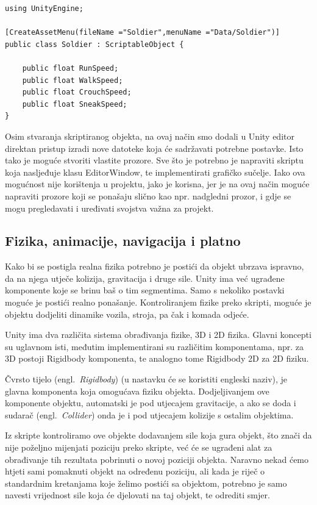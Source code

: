 \begin{lstlisting}[caption={Stvaranje skriptiranog objekta}, label=CreateScriptableObject]
using UnityEngine;

[CreateAssetMenu(fileName ="Soldier",menuName ="Data/Soldier")]
public class Soldier : ScriptableObject {

    public float RunSpeed;
    public float WalkSpeed;
    public float CrouchSpeed;
    public float SneakSpeed;
}
\end{lstlisting}

Osim stvaranja skriptiranog objekta, na ovaj način smo dodali u Unity editor direktan pristup izradi nove datoteke koja će sadržavati potrebne postavke.
Isto tako je moguće stvoriti vlastite prozore. Sve što je potrebno je napraviti skriptu koja nasljeđuje klasu EditorWindow, te implementirati grafičko sučelje. Iako ova mogućnost nije korištenja u projektu, jako je korisna, jer je na ovaj način moguće napraviti prozore koji se ponašaju slično kao npr. nadgledni prozor, i gdje se mogu pregledavati i uređivati svojstva važna za projekt.

\subsection{Fizika, animacije, navigacija i platno}
Kako bi se postigla realna fizika potrebno je postići da objekt ubrzava ispravno, da na njega utječe kolizija, gravitacija i druge sile. Unity ima već ugrađene komponente koje se brinu baš o tim segmentima. Samo s nekoliko postavki moguće je postići realno ponašanje. Kontroliranjem fizike preko skripti, moguće je objektu dodjeliti dinamike vozila, stroja, pa čak i komada odjeće.

Unity ima dva različita sistema obrađivanja fizike, 3D i 2D fizika. Glavni koncepti su uglavnom isti, međutim implementirani su različitim komponentama, npr. za 3D postoji Rigidbody komponenta, te analogno tome Rigidbody 2D za 2D fiziku.

Čvrsto tijelo (engl.~\textit{Rigidbody}) (u nastavku će se koristiti engleski naziv), je glavna komponenta koja omogućava fiziku objekta. Dodjeljivanjem ove komponente objektu, automatski je pod utjecajem gravitacije, a ako se doda i sudarač (engl.~\textit{Collider}) onda je i pod utjecajem kolizije s ostalim objektima.

Iz skripte kontroliramo ove objekte dodavanjem sile koja gura objekt, što znači da nije poželjno mijenjati poziciju preko skripte, već će se ugrađeni alat za obrađivanje tih rezultata pobrinuti o novoj poziciji objekta. Naravno nekad ćemo htjeti sami pomaknuti objekt na određenu poziciju, ali kada je riječ o standardnim kretanjama koje želimo postići sa objektom, potrebno je samo navesti vrijednost sile koja će djelovati na taj objekt, te odrediti smjer.

